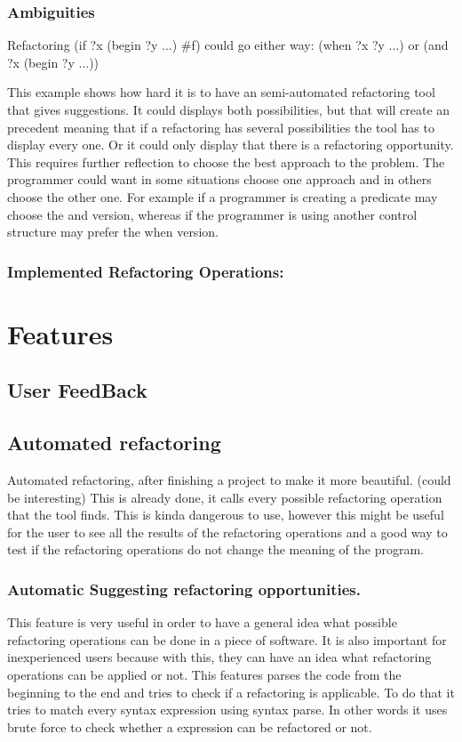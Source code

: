 \subsubsection{Ambiguities}
Refactoring (if ?x (begin ?y ...) \#f) could go either way:
(when ?x ?y ...)
or
(and ?x (begin ?y ...))

This example shows how hard it is to have an semi-automated refactoring tool
that gives suggestions. It could displays both possibilities, but that will
create an precedent meaning that if a refactoring has several possibilities the
tool has to display every one. Or it could only display that there is a
refactoring opportunity. This requires further reflection to choose the best
approach to the problem.
The programmer could want in some situations choose one approach and in others
choose the other one. For example if a programmer is creating a predicate may
choose the and version, whereas if the programmer is using another control structure
may prefer the when version.

\subsubsection{Implemented Refactoring Operations:}

\section{Features}

\subsection{User FeedBack}


\subsection{Automated refactoring}
Automated refactoring, after finishing a project to make it more beautiful. (could be interesting)
This is already done, it calls every possible refactoring operation that the tool finds.
This is kinda dangerous to use, however this might be useful for the user to see all the results of the refactoring operations
and a good way to test if the refactoring operations do not change the meaning of the program.

\subsubsection{Automatic Suggesting refactoring opportunities.} %
This feature is very useful in order to have a general idea what possible refactoring
operations can be done in a piece of software. It is also important for inexperienced
users because with this, they can have an idea what refactoring operations can be applied or not.
This features parses the code from the beginning to the end and tries to check if a refactoring is applicable.
To do that it tries to match every syntax expression using syntax parse. In other words it
uses brute force to check whether a expression can be refactored or not.

